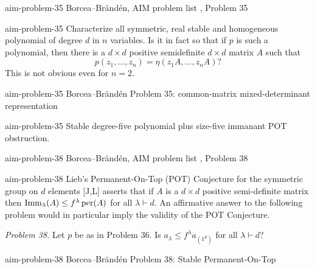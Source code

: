 
\begin{cxsource}{aim-problem-35}
Borcea--Br\"and\'en, AIM problem list \citeyearpar{AIMStableProblems}, Problem 35
\end{cxsource}

\begin{cxstatement}{aim-problem-35}
Characterize all symmetric, real stable and homogeneous polynomial of degree $d$ in $n$ variables.  Is it in fact so that if $p$ is such a polynomial, then there is a $d\times d$ positive semidefinite $d\times d$ matrix $A$ such that
\[p(z_1,\ldots,z_n)=\eta(z_1A,\ldots,z_nA)?\]
This is not obvious even for $n=2$.
\end{cxstatement}

\begin{cxsummary}{aim-problem-35}
Borcea--Br\"and\'en Problem 35: common-matrix mixed-determinant representation \citeyearpar{AIMStableProblems}
\end{cxsummary}

\begin{cxcertificate}{aim-problem-35}
Stable degree-five polynomial plus size-five immanant POT obstruction.
\end{cxcertificate}


\begin{cxsource}{aim-problem-38}
Borcea--Br\"and\'en, AIM problem list \citeyearpar{AIMStableProblems}, Problem 38
\end{cxsource}

\begin{cxstatement}{aim-problem-38}
Lieb's Permanent-On-Top (POT) Conjecture for the symmetric group on $d$ elements [J,L] asserts that if $A$ is a $d\times d$ positive semi-definite matrix then $\operatorname{Imm}_\lambda(A)\le f^\lambda\operatorname{per}(A)$ for all $\lambda\vdash d$.  An affirmative answer to the following problem would in particular imply the validity of the POT Conjecture.

\emph{Problem 38.}  Let $p$ be as in Problem 36.  Is $a_\lambda\le f^\lambda a_{(1^d)}$ for all $\lambda\vdash d$?
\end{cxstatement}

\begin{cxsummary}{aim-problem-38}
Borcea--Br\"and\'en Problem 38: Stable Permanent-On-Top \citeyearpar{AIMStableProblems}
\end{cxsummary}

